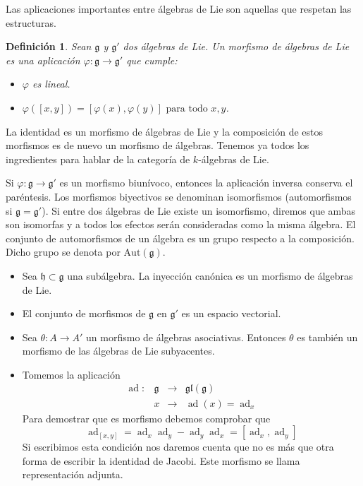 \documentclass[a4paper,draft,12pt]{scrartcl}
\newtheorem{defi}{Definición}[section]%
\newcommand{\g}{\mathfrak{g}}%
\newcommand{\lto}{\longrightarrow}%
\newcommand{\df}[1]{\textsf{\color{blue}#1}}
\DeclareMathOperator{\ad}{ad}  %
\begin{document}
Las aplicaciones importantes entre álgebras de Lie son aquellas que respetan las estructuras.

\begin{defi}
Sean $\g$ y $\g'$  dos álgebras de Lie. Un  \df{morfismo de álgebras de Lie}  es una aplicación $\varphi : \g \rightarrow  \g'$   que cumple:
\begin{itemize}
\item $\varphi$ es lineal.
\item $\varphi ([x,y]) = [\varphi(x),\varphi(y)] \text{ para todo } x,y$.
\end{itemize}
\end{defi}

La identidad es un morfismo de álgebras de Lie y la composición de estos morfismos es de nuevo un morfismo de álgebras. Tenemos ya todos los ingredientes para hablar de la categoría de  $k$-álgebras de Lie. 

Si $\varphi: \g \rightarrow \g'$ es un morfismo biunívoco, entonces la aplicación inversa conserva el paréntesis.  Los morfismos biyectivos se denominan  \df{isomorfismos}  (\df{automorfismos} si $\g= \g'$).   Si entre dos álgebras de Lie existe un isomorfismo, diremos que ambas son isomorfas y a todos los efectos serán consideradas como la misma álgebra. El conjunto de automorfismos de un álgebra es un grupo respecto a la composición.  Dicho grupo se denota por $\textrm{Aut}(\g)$.


\bigskip


\begin{itemize}

\item Sea $\mathfrak{h} \subset \g$ una subálgebra. La inyección canónica es un morfismo de álgebras de Lie.

\item  El conjunto de morfismos de $\g$ en $\g'$ es un espacio vectorial.

\item Sea $\theta:A\rightarrow A'$ un morfismo de álgebras asociativas.  Entonces $\theta$ es también un morfismo de las álgebras de Lie subyacentes.

\item Tomemos la aplicación
$$
\begin{array}{cccc}
 \ad: & \g & \lto & \mathfrak{gl}(\g) \\
    & x & \lto & \ad(x)= \ad_x
    \end{array}
    $$
Para demostrar que es morfismo debemos comprobar que 
$$
\ad_{[x,y]}= \ad_x\ad_y-\ad_y\ad_x= [\ad_x,\ad_y]
$$
Si escribimos esta condición nos daremos cuenta que no es más que otra forma de escribir la identidad de Jacobi.  Este morfismo se llama  \df{representación adjunta}. 




\end{itemize}
\end{document}
